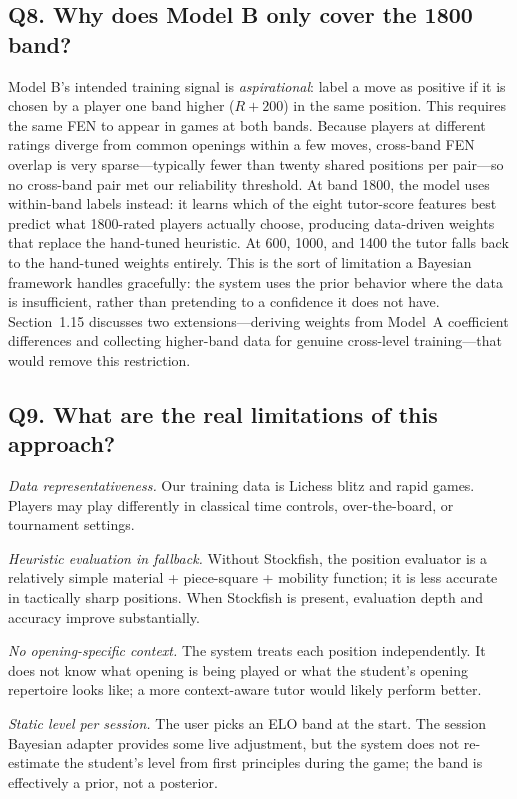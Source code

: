 \documentclass[11pt]{article}
\begin{document}
\subsection*{Q8. Why does Model B only cover the 1800 band?}
Model B's intended training signal is \emph{aspirational}: label a move as positive if it is chosen by a player one band higher ($R{+}200$) in the same position. This requires the same FEN to appear in games at both bands. Because players at different ratings diverge from common openings within a few moves, cross-band FEN overlap is very sparse---typically fewer than twenty shared positions per pair---so no cross-band pair met our reliability threshold. At band 1800, the model uses within-band labels instead: it learns which of the eight tutor-score features best predict what 1800-rated players actually choose, producing data-driven weights that replace the hand-tuned heuristic. At 600, 1000, and 1400 the tutor falls back to the hand-tuned weights entirely. This is the sort of limitation a Bayesian framework handles gracefully: the system uses the prior behavior where the data is insufficient, rather than pretending to a confidence it does not have. Section~1.15 discusses two extensions---deriving weights from Model~A coefficient differences and collecting higher-band data for genuine cross-level training---that would remove this restriction.

\subsection*{Q9. What are the real limitations of this approach?}
\emph{Data representativeness.} Our training data is Lichess blitz and rapid games. Players may play differently in classical time controls, over-the-board, or tournament settings.

\emph{Heuristic evaluation in fallback.} Without Stockfish, the position evaluator is a relatively simple material + piece-square + mobility function; it is less accurate in tactically sharp positions. When Stockfish is present, evaluation depth and accuracy improve substantially.

\emph{No opening-specific context.} The system treats each position independently. It does not know what opening is being played or what the student's opening repertoire looks like; a more context-aware tutor would likely perform better.

\emph{Static level per session.} The user picks an ELO band at the start. The session Bayesian adapter provides some live adjustment, but the system does not re-estimate the student's level from first principles during the game; the band is effectively a prior, not a posterior.
\end{document}

